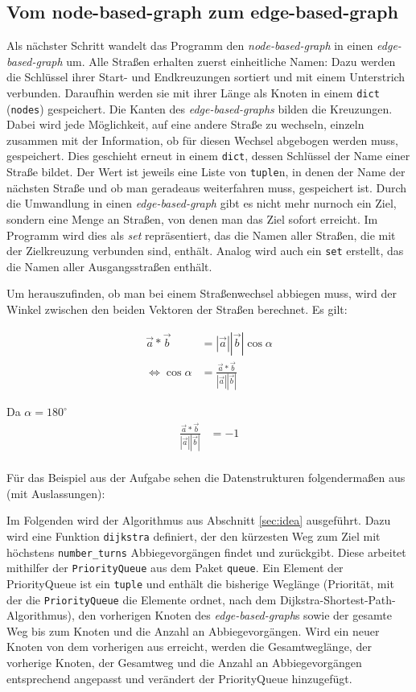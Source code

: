 \documentclass[a4paper,10pt,ngerman]{scrartcl}
\begin{document}
\subsection{Vom node-based-graph zum edge-based-graph}
Als nächster Schritt wandelt das Programm den \textit{node-based-graph} in einen \textit{edge-based-graph} um.
Alle Straßen erhalten zuerst einheitliche Namen: Dazu werden die Schlüssel ihrer Start- und Endkreuzungen sortiert und mit einem Unterstrich verbunden.
Daraufhin werden sie mit ihrer Länge als Knoten in einem \texttt{dict} (\texttt{nodes}) gespeichert.
Die Kanten des \textit{edge-based-graphs} bilden die Kreuzungen.
Dabei wird jede Möglichkeit, auf eine andere Straße zu wechseln, einzeln zusammen mit der Information, ob für diesen Wechsel abgebogen werden muss, gespeichert.
Dies geschieht erneut in einem \texttt{dict}, dessen Schlüssel der Name einer Straße bildet.
Der Wert ist jeweils eine Liste von \texttt{tuple}n, in denen der Name der nächsten Straße und ob man geradeaus weiterfahren muss, gespeichert ist.
Durch die Umwandlung in einen \textit{edge-based-graph} gibt es nicht mehr nurnoch ein Ziel, sondern eine Menge an Straßen, von denen man das Ziel sofort erreicht.
Im Programm wird dies als \textit{set} repräsentiert, das die Namen aller Straßen, die mit der Zielkreuzung verbunden sind, enthält.
Analog wird auch ein \texttt{set} erstellt, das die Namen aller Ausgangsstraßen enthält.

Um herauszufinden, ob man bei einem Straßenwechsel abbiegen muss, wird der Winkel zwischen den beiden Vektoren der Straßen berechnet.
Es gilt:

\begin{align*}
  \vec{a}*\vec{b} &= |\vec{a}||\vec{b}|\cos{\alpha} \\
  \Leftrightarrow \cos{\alpha} &= \frac{\vec{a}*\vec{b}}{|\vec{a}||\vec{b}|}
\end{align*}

Da $\alpha = 180^{\circ}$
\begin{align*}
  \frac{\vec{a}*\vec{b}}{|\vec{a}||\vec{b}|} &= -1 \\
\end{align*}


Für das Beispiel aus der Aufgabe sehen die Datenstrukturen folgendermaßen aus (mit Auslassungen):



Im Folgenden wird der Algorithmus aus Abschnitt \ref{sec:idea} ausgeführt.
Dazu wird eine Funktion \texttt{dijkstra} definiert, der den kürzesten Weg zum Ziel mit höchstens \texttt{number\_turns} Abbiegevorgängen findet und zurückgibt.
Diese arbeitet mithilfer der \texttt{PriorityQueue} aus dem Paket \texttt{queue}.
Ein Element der PriorityQueue ist ein \texttt{tuple} und enthält die bisherige Weglänge (Priorität, mit der die \texttt{PriorityQueue} die Elemente ordnet, nach dem Dijkstra-Shortest-Path-Algorithmus), den vorherigen Knoten des \textit{edge-based-graph}s sowie der gesamte Weg bis zum Knoten und die Anzahl an Abbiegevorgängen.
Wird ein neuer Knoten von dem vorherigen aus erreicht, werden die Gesamtweglänge, der vorherige Knoten, der Gesamtweg und die Anzahl an Abbiegevorgängen entsprechend angepasst und verändert der PriorityQueue hinzugefügt.
\end{document}
